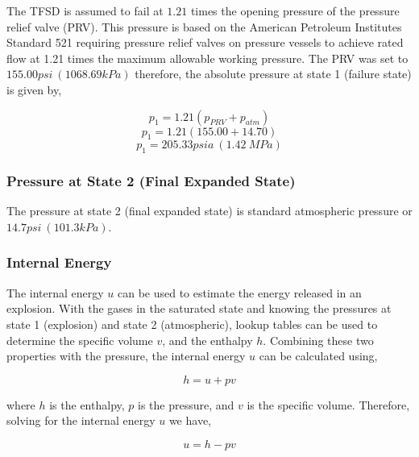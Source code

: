 \documentclass[10pt,parskip=half,
toc=sectionentrywithdots,
bibliography=totocnumbered,
captions=tableheading,numbers=noendperiod]{scrartcl}
\begin{document}
The TFSD is assumed to fail at \(1.21\) times the opening pressure of
the pressure relief valve (PRV)\cite{Engineers2013}. This pressure is
based on the American Petroleum Institutes Standard 521 requiring
pressure relief valves on pressure vessels to achieve rated flow at 1.21
times the maximum allowable working pressure. The PRV was set to
\(155.00psi\:(1068.69kPa)\) therefore, the absolute pressure at state 1
(failure state) is given by,

\begin{equation}p_1 = 1.21\left(p_{PRV}+p_{atm}\right)\end{equation}
\begin{equation}p_1 = 1.21\left(155.00+14.70\right)\end{equation}
\begin{equation}p_1 = 205.33 psia\:(1.42\:MPa)\end{equation}

\hypertarget{pressure-at-state-2-final-expanded-state}{%
\subsubsection{Pressure at State 2 (Final Expanded
State)}\label{pressure-at-state-2-final-expanded-state}}

The pressure at state 2 (final expanded state) is standard atmospheric
pressure or \(14.7psi\:(101.3kPa)\).

\hypertarget{internal-energy-1}{%
\subsubsection{Internal Energy}\label{internal-energy-1}}

The internal energy \(u\) can be used to estimate the energy released in
an explosion. With the gases in the saturated state and knowing the
pressures at state 1 (explosion) and state 2 (atmospheric), lookup
tables can be used to determine the specific volume \(v\), and the
enthalpy \(h\). Combining these two properties with the pressure, the
internal energy \(u\) can be calculated using,

\begin{equation}h = u + pv\end{equation}

where \(h\) is the enthalpy, \(p\) is the pressure, and \(v\) is the
specific volume. Therefore, solving for the internal energy \(u\) we
have,

\begin{equation}u = h - pv\end{equation}
\end{document}
